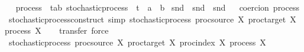 \begin{isabellebody}
\isadelimproof
\ %
\endisadelimproof
%
\isatagproof
\isacommand{{\isachardot}{\kern0pt}}\isamarkupfalse%
%
\endisatagproof
{\isafoldproof}%
%
\isadelimproof
%
\endisadelimproof
\isanewline
\isanewline
{}\isamarkupfalse%
\ process\ {\isacharcolon}{\kern0pt}{\isacharcolon}{\kern0pt}\ {\isachardoublequoteopen}{\isacharparenleft}{\kern0pt}{\isacharprime}{\kern0pt}t{\isacharcomma}{\kern0pt}{\isacharprime}{\kern0pt}a{\isacharcomma}{\kern0pt}{\isacharprime}{\kern0pt}b{\isacharparenright}{\kern0pt}\ stochastic{\isacharunderscore}{\kern0pt}process\ {\isasymRightarrow}\ {\isacharprime}{\kern0pt}t\ {\isasymRightarrow}\ {\isacharprime}{\kern0pt}a\ {\isasymRightarrow}\ {\isacharprime}{\kern0pt}b{\isachardoublequoteclose}\isanewline
{}\ {\isachardoublequoteopen}snd\ {\isasymcirc}\ snd\ {\isasymcirc}\ snd{\isachardoublequoteclose}%
\isadelimproof
\ %
\endisadelimproof
%
\isatagproof
\isacommand{{\isachardot}{\kern0pt}}\isamarkupfalse%
%
\endisatagproof
{\isafoldproof}%
%
\isadelimproof
%
\endisadelimproof
\isanewline
\isanewline
{}\isamarkupfalse%
\ {\isacharbrackleft}{\kern0pt}{\isacharbrackleft}{\kern0pt}coercion\ process{\isacharbrackright}{\kern0pt}{\isacharbrackright}{\kern0pt}\isanewline
\isanewline
{}\isamarkupfalse%
\ stochastic{\isacharunderscore}{\kern0pt}process{\isacharunderscore}{\kern0pt}construct\ {\isacharbrackleft}{\kern0pt}simp{\isacharbrackright}{\kern0pt}{\isacharcolon}{\kern0pt}\ {\isachardoublequoteopen}stochastic{\isacharunderscore}{\kern0pt}process\ {\isacharparenleft}{\kern0pt}proc{\isacharunderscore}{\kern0pt}source\ X{\isacharparenright}{\kern0pt}\ {\isacharparenleft}{\kern0pt}proc{\isacharunderscore}{\kern0pt}target\ X{\isacharparenright}{\kern0pt}\ {\isacharparenleft}{\kern0pt}process\ X{\isacharparenright}{\kern0pt}{\isachardoublequoteclose}\isanewline
%
\isadelimproof
\ \ %
\endisadelimproof
%
\isatagproof
{}\isamarkupfalse%
\ {\isacharparenleft}{\kern0pt}transfer{\isacharcomma}{\kern0pt}\ force{\isacharparenright}{\kern0pt}%
\endisatagproof
{\isafoldproof}%
%
\isadelimproof
\isanewline
%
\endisadelimproof
\isanewline
{}\isamarkupfalse%
\ stochastic{\isacharunderscore}{\kern0pt}process\ {\isachardoublequoteopen}proc{\isacharunderscore}{\kern0pt}source\ X{\isachardoublequoteclose}\ {\isachardoublequoteopen}proc{\isacharunderscore}{\kern0pt}target\ X{\isachardoublequoteclose}\ {\isachardoublequoteopen}proc{\isacharunderscore}{\kern0pt}index\ X{\isachardoublequoteclose}\ {\isachardoublequoteopen}process\ X{\isachardoublequoteclose}\isanewline

\end{isabellebody}
